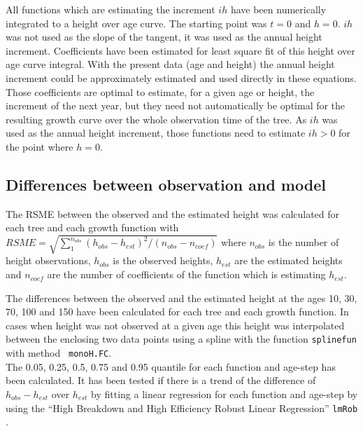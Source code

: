 \documentclass[a4paper,twocolumn]{article}
\begin{document}
All functions which are estimating the increment $ih$ have been
numerically integrated to a height over age curve. The starting point
was $t=0$ and $h=0$. $ih$ was not used as the slope of the tangent, it 
was used as the annual height increment. Coefficients have been
estimated for least square fit of this height over age curve
integral. With the present data (age and height) the annual height
increment could be approximately estimated and used directly in these
equations. Those coefficients are optimal to estimate, for a given age
or height, the increment of the next year, but they need not
automatically be optimal for the resulting growth curve over the whole
observation time of the tree. As $ih$ was used as the annual height
increment, those functions need to estimate $ih > 0$ for the
point where $h=0$.

\subsection{Differences between observation and model}

The RSME between the observed and the estimated
height was calculated for each tree and each growth function with
$RSME = \sqrt{\sum_{1}^{n_{obs}} (h_{obs} - h_{est})^2 / (n_{obs} - n_{coef})}$
where $n_{obs}$ is the number of height observations, $h_{obs}$ is
the observed heights, $h_{est}$ are the estimated heights and
$n_{coef}$ are the number of coefficients of the function which is
estimating $h_{est}$.


The differences between the observed and the estimated height at the
ages 10, 30, 70, 100 and 150 have been calculated for each tree and
each growth function. In cases when height was not observed at a given
age this height was interpolated between the enclosing two data points
using a spline with the function {\tt splinefun} with method {\tt
 monoH.FC}.\\ 
%
The 0.05, 0.25, 0.5, 0.75 and 0.95 quantile for each function and
age-step has been calculated. It has been tested if there is a trend
of the difference of $h_{obs} - h_{est}$ over $h_{est}$ by fitting a
linear regression for each function and age-step by using the ``High
Breakdown and High Efficiency Robust Linear Regression'' {\tt lmRob}
\citep{robust2014}.
\end{document}
